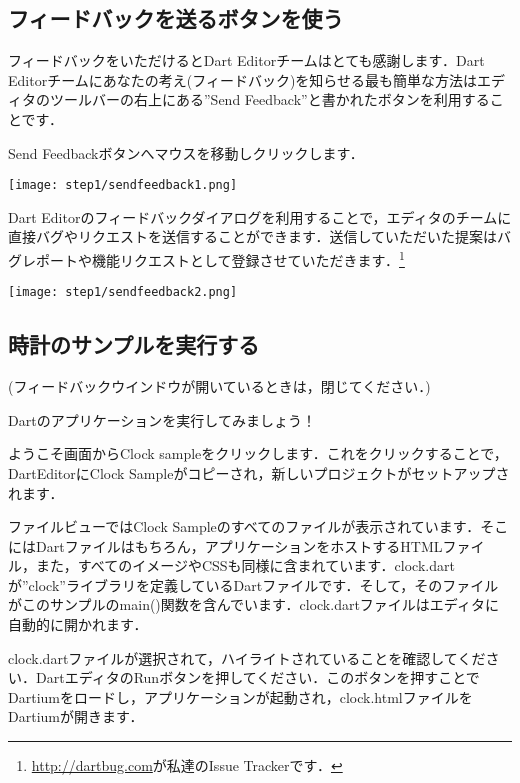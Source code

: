 \subsection{フィードバックを送るボタンを使う}

フィードバックをいただけるとDart Editorチームはとても感謝します．Dart Editorチームにあなたの考え(フィードバック)を知らせる最も簡単な方法はエディタのツールバーの右上にある''Send Feedback''と書かれたボタンを利用することです．

Send Feedbackボタンへマウスを移動しクリックします．

\texttt{[image: step1/sendfeedback1.png]}

Dart Editorのフィードバックダイアログを利用することで，エディタのチームに直接バグやリクエストを送信することができます．送信していただいた提案はバグレポートや機能リクエストとして登録させていただきます．\footnote{\url{http://dartbug.com}が私達のIssue Trackerです．}

\texttt{[image: step1/sendfeedback2.png]}

\subsection{時計のサンプルを実行する}

(フィードバックウインドウが開いているときは，閉じてください．)

Dartのアプリケーションを実行してみましょう！

ようこそ画面からClock sampleをクリックします．これをクリックすることで，DartEditorにClock Sampleがコピーされ，新しいプロジェクトがセットアップされます．




ファイルビューではClock Sampleのすべてのファイルが表示されています．そこにはDartファイルはもちろん，アプリケーションをホストするHTMLファイル，また，すべてのイメージやCSSも同様に含まれています．clock.dartが''clock''ライブラリを定義しているDartファイルです．そして，そのファイルがこのサンプルのmain()関数を含んでいます．clock.dartファイルはエディタに自動的に開かれます．


clock.dartファイルが選択されて，ハイライトされていることを確認してください．DartエディタのRunボタンを押してください．このボタンを押すことでDartiumをロードし，アプリケーションが起動され，clock.htmlファイルをDartiumが開きます．

